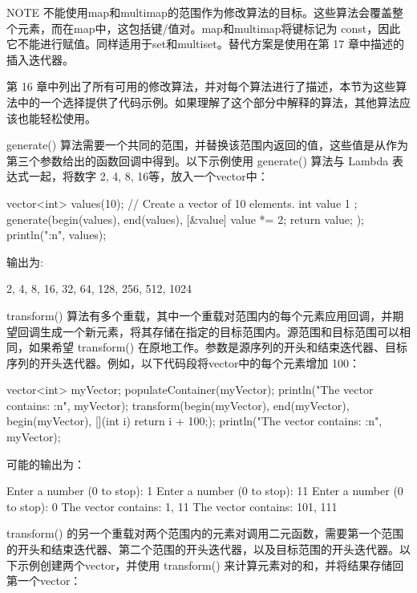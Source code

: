 \begin{myNotic}{NOTE}
不能使用map和multimap的范围作为修改算法的目标。这些算法会覆盖整个元素，而在map中，这包括键/值对。map和multimap将键标记为 const，因此它不能进行赋值。同样适用于set和multiset。替代方案是使用在第 17 章中描述的插入迭代器。
\end{myNotic}

第 16 章中列出了所有可用的修改算法，并对每个算法进行了描述，本节为这些算法中的一个选择提供了代码示例。如果理解了这个部分中解释的算法，其他算法应该也能轻松使用。


generate() 算法需要一个共同的范围，并替换该范围内返回的值，这些值是从作为第三个参数给出的函数回调中得到。以下示例使用 generate() 算法与 Lambda 表达式一起，将数字 2, 4, 8, 16等，放入一个vector中：

\begin{cpp}
vector<int> values(10); // Create a vector of 10 elements.
int value { 1 };
generate(begin(values), end(values), [&value]{ value *= 2; return value; });
println("{:n}", values);
\end{cpp}

输出为:

\begin{shell}
2, 4, 8, 16, 32, 64, 128, 256, 512, 1024
\end{shell}


transform() 算法有多个重载，其中一个重载对范围内的每个元素应用回调，并期望回调生成一个新元素，将其存储在指定的目标范围内。源范围和目标范围可以相同，如果希望 transform() 在原地工作。参数是源序列的开头和结束迭代器、目标序列的开头迭代器。例如，以下代码段将vector中的每个元素增加 100：

\begin{cpp}
vector<int> myVector;
populateContainer(myVector);
println("The vector contains: {:n}", myVector);
transform(begin(myVector), end(myVector), begin(myVector),
    [](int i){ return i + 100;});
println("The vector contains: {:n}", myVector);
\end{cpp}

可能的输出为：

\begin{shell}
Enter a number (0 to stop): 1
Enter a number (0 to stop): 11
Enter a number (0 to stop): 0
The vector contains: 1, 11
The vector contains: 101, 111
\end{shell}

transform() 的另一个重载对两个范围内的元素对调用二元函数，需要第一个范围的开头和结束迭代器、第二个范围的开头迭代器，以及目标范围的开头迭代器。以下示例创建两个vector，并使用 transform() 来计算元素对的和，并将结果存储回第一个vector：

